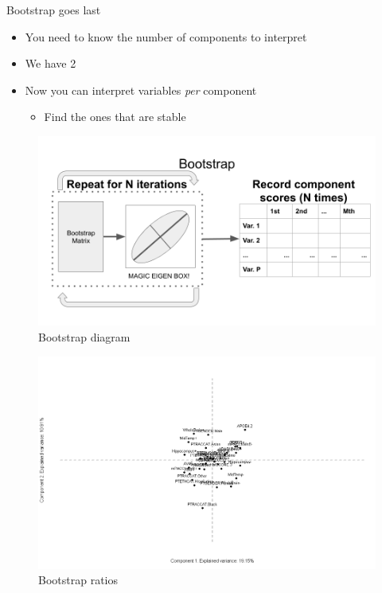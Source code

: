 \documentclass[
  ignorenonframetext,
]{beamer}
\providecommand{\tightlist}{%
  \setlength{\itemsep}{0pt}\setlength{\parskip}{0pt}}
\begin{document}
\begin{frame}{Bootstrap goes last}
\protect\hypertarget{bootstrap-goes-last}{}

\begin{itemize}[<+->]
\tightlist
\item
  You need to know the number of components to interpret
\item
  We have 2
\item
  Now you can interpret variables \emph{per} component

  \begin{itemize}[<+->]
  \tightlist
  \item
    Find the ones that are stable
  \end{itemize}
\end{itemize}

\end{frame}

\begin{frame}

\begin{figure}
\centering
\includegraphics{../Images/bootstrap_diagram.png}
\caption{Bootstrap diagram}
\end{figure}

\end{frame}

\begin{frame}

\begin{figure}
\centering
\includegraphics{../Images/boot1.png}
\caption{Bootstrap ratios}
\end{figure}

\end{frame}
\end{document}
